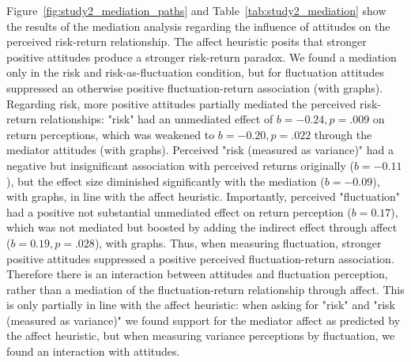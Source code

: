 \documentclass[a4paper,man, natbib,floatsintext]{apa6} %
\begin{document}
Figure~\ref{fig:study2_mediation_paths} and Table~\ref{tab:study2_mediation} show the results of the mediation analysis regarding the influence of attitudes on the perceived risk-return relationship. The affect heuristic posits that stronger positive  attitudes produce a stronger risk-return paradox.
We found a mediation only in the risk and risk-as-fluctuation condition, but for fluctuation attitudes suppressed an otherwise positive fluctuation-return association (with graphs). Regarding risk, more positive attitudes partially mediated the perceived risk-return relationships: "risk" had an unmediated effect of $b=-0.24, p=.009$ on return perceptions, which was weakened to $b=-0.20, p=.022$ through the mediator attitudes (with graphs). Perceived "risk (measured as variance)" had a negative but insignificant association with perceived returns originally ($b=-0.11$), but the effect size diminished significantly with the mediation ($b=−0.09$), with graphs, in line with the affect heuristic. Importantly, perceived "fluctuation" had a positive not substantial unmediated effect on return perception ($b=0.17$), which was not mediated but boosted by adding the indirect effect through affect ($b=0.19, p=.028$), with graphs. Thus, when measuring fluctuation, stronger positive attitudes suppressed a positive perceived fluctuation-return association. Therefore there is an interaction between attitudes and fluctuation perception, rather than a mediation of the fluctuation-return relationship through affect. This is only partially in line with the affect heuristic: when asking for "risk" and "risk (measured as variance)" we found support for the mediator affect as predicted by the affect heuristic, but when measuring variance perceptions by fluctuation, we found an interaction with attitudes.
\end{document}
